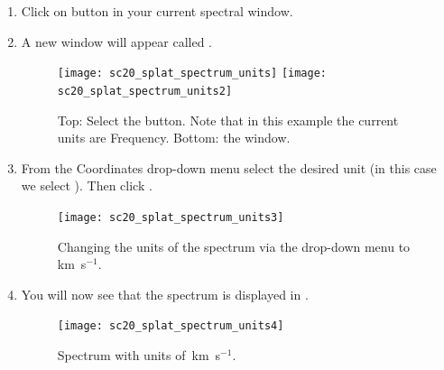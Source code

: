\documentclass[11pt,oneside,chapters]{starlink}
\newcommand{\kms}{\mbox{$\,$km~s$^{-1}$}}   %
\newcommand{\kms}{\,km~s$^{-1}$}   %
\begin{document}
\begin{enumerate}[label=(\textbf{\arabic*})]

\item Click on 
button in your current spectral window.


\item A new window will appear called .

\begin{figure}[h!]
\begin{center}
\texttt{[image: sc20\_splat\_spectrum\_units]}
\texttt{[image: sc20\_splat\_spectrum\_units2]}
\caption[Change the units of the current spectrum.]{\label{fig:splat_units1}
  Top: Select the 
  button. Note that in this example the current units are Frequency.
  Bottom: the  window.}
\end{center}
\end{figure}


\item From the Coordinates drop-down menu select the desired unit
(in this case we select ).
Then click .

\begin{figure}[h!]
\begin{center}
\texttt{[image: sc20\_splat\_spectrum\_units3]}
\caption[Changing the units via the drop-down menu.]{\label{fig:splat_units2}
  Changing the units of the spectrum via the drop-down menu to \kms.}
\end{center}
\end{figure}

\item You will now see that the spectrum is
displayed in .

\begin{figure}[h!]
\begin{center}
\texttt{[image: sc20\_splat\_spectrum\_units4]}
\caption[Spectrum with units of \kms.]{\label{fig:splat_units3}
  Spectrum with units of \kms.}
\end{center}
\end{figure}

\end{enumerate}
\end{document}
